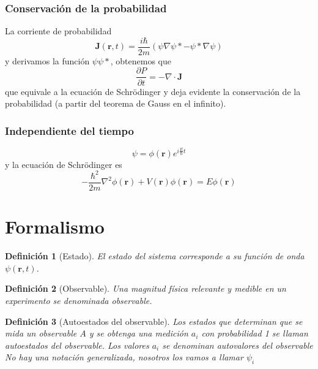 \documentclass{book}
\numberwithin{equation}{section} %
\newtheorem{definition}{Definición}[chapter]
\begin{document}
\subsubsection{Conservación de la probabilidad}
La corriente de probabilidad
\begin{equation}
    \textbf{J}(\textbf{r}, t) = \frac{i \hbar}{2m} \left(\psi \nabla \psi* - \psi* \nabla \psi\right)
    \label{eq:corriente_proba}
\end{equation}
y derivamos la función $\psi \psi*$, obtenemos que
\begin{equation}
    \frac{\partial P}{\partial t} = - \nabla \cdot \textbf{J}
\end{equation}
que equivale a la ecuación de Schrödinger y deja evidente la conservación de la probabilidad (a partir del teorema de Gauss en el infinito).

\subsubsection{Independiente del tiempo}

\begin{equation}
    \psi = \phi(\textbf{r}) e^{i \frac{E}{\hbar} t}
\end{equation}
y la ecuación de Schrödinger es
\begin{equation}
    - \frac{\hbar^2}{2m} \nabla^2 \phi(\textbf{r}) + V(\textbf{r}) \phi(\textbf{r}) = E \phi(\textbf{r})
\end{equation}

\section{Formalismo}

\begin{definition}[Estado]
    El estado del sistema corresponde a su función de onda $\psi(\textbf{r},t)$.
\end{definition}

\begin{definition}[Observable]
    Una magnitud física relevante y medible en un experimento se denominada observable.
\end{definition}

\begin{definition}[Autoestados del observable]
    Los estados que determinan que se mida un observable $A$ y se obtenga una medición $a_i$ con probabilidad 1 se llaman autoestados del observable.
    Los valores $a_i$ se denominan autovalores del observable
    No hay una notación generalizada, nosotros los vamos a llamar $\psi_i$
\end{definition}
\end{document}
